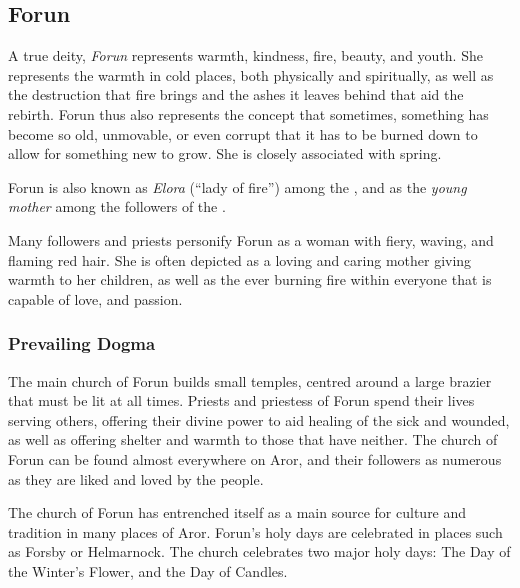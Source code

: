 \ifimages
\clearpage
{}
\clearpage
\fi

\subsection{Forun}
\label{sec:Forun}

A true deity, \emph{Forun} represents warmth, kindness, fire, beauty, and
youth. She represents the warmth in cold places, both physically and
spiritually, as well as the destruction that fire brings and the ashes it
leaves behind that aid the rebirth. Forun thus also represents the concept
that sometimes, something has become so old, unmovable, or even corrupt that
it has to be burned down to allow for something new to grow. She is closely
associated with spring.

Forun is also known as \emph{Elora} (``lady of fire'') among the
, and as the \emph{young mother} among the followers of
the .

Many followers and priests personify Forun as a woman with fiery, waving, and
flaming red hair. She is often depicted as a loving and caring mother giving
warmth to her children, as well as the ever burning fire within everyone that
is capable of love, and passion.

\subsubsection{Prevailing Dogma}

The main church of Forun builds small temples, centred around a large brazier
that must be lit at all times. Priests and priestess of Forun spend their
lives serving others, offering their divine power to aid healing of the sick
and wounded, as well as offering shelter and warmth to those that have
neither. The church of Forun can be found almost everywhere on Aror, and their
followers as numerous as they are liked and loved by the people.

The church of Forun has entrenched itself as a main source for culture and
tradition in many places of Aror. Forun's holy days are celebrated in places
such as Forsby or Helmarnock. The church celebrates two major holy days: The
Day of the Winter's Flower, and the Day of Candles.

